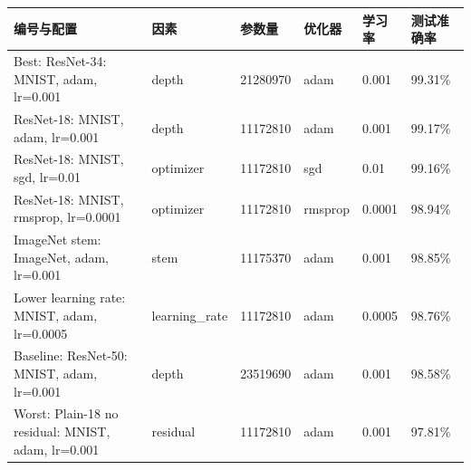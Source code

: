 \begin{tabular}{llllll}
\toprule
编号与配置 & 因素 & 参数量 & 优化器 & 学习率 & 测试准确率 \\
\midrule
Best: ResNet-34: MNIST, adam, lr=0.001 & depth & 21280970 & adam & 0.001 & 99.31\% \\
ResNet-18: MNIST, adam, lr=0.001 & depth & 11172810 & adam & 0.001 & 99.17\% \\
ResNet-18: MNIST, sgd, lr=0.01 & optimizer & 11172810 & sgd & 0.01 & 99.16\% \\
ResNet-18: MNIST, rmsprop, lr=0.0001 & optimizer & 11172810 & rmsprop & 0.0001 & 98.94\% \\
ImageNet stem: ImageNet, adam, lr=0.001 & stem & 11175370 & adam & 0.001 & 98.85\% \\
Lower learning rate: MNIST, adam, lr=0.0005 & learning\_rate & 11172810 & adam & 0.0005 & 98.76\% \\
Baseline: ResNet-50: MNIST, adam, lr=0.001 & depth & 23519690 & adam & 0.001 & 98.58\% \\
Worst: Plain-18 no residual: MNIST, adam, lr=0.001 & residual & 11172810 & adam & 0.001 & 97.81\% \\
\bottomrule
\end{tabular}
